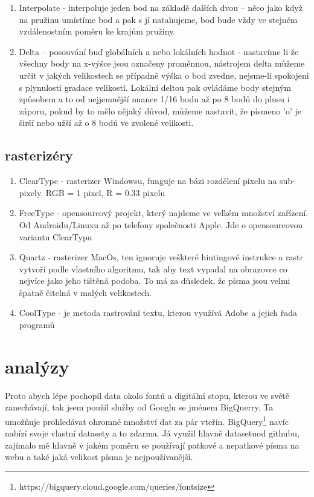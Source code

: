 \documentclass[a4paper]{article}
\begin{document}
\begin{enumerate}
\begin{enumerate}
\item Interpolate - interpoluje jeden bod na základě dalších dvou – něco jako když na pružinu umístíme bod a pak s jí natahujeme, bod bude vždy ve stejném vzdálenostním poměru ke krajům pružiny.

\item Delta – posouvání buď globálních a nebo lokálních hodnot - nastavíme li že všechny body na x-výšce jsou označeny proměnnou, nástrojem delta můžeme určit v jakých velikostech se případně výška o bod zvedne, nejsme-li spokojeni s plynulostí gradace velikostí. Lokální deltou pak ovládáme body stejným způsobem a to od nejjemnější nuance 1/16 bodu až po 8 bodů do plusu i záporu, pokud by to mělo nějaký důvod, můžeme nastavit, že písmeno 'o' je širší nebo užší až o 8 bodů ve zvolené velikosti. 

\end{enumerate}

\subsection{rasterizéry}

\begin{enumerate}
\item ClearType - rasterizer Windowsu, funguje na bázi rozdělení pixelu na sub-pixely. RGB = 1 pixel, R = 0.33 pixelu

\item FreeType - opensourcový projekt, který najdeme ve velkém množství zařízení. Od Androidu/Linuxu až po telefony společnosti Apple. Jde o opensourcovou variantu ClearTypu

\item Quartz - rasterizer MacOs, ten ignoruje veškteré hintingové instrukce a rastr vytvoří podle vlastního algoritmu, tak aby text vypadal na obrazovce co nejvíce jako jeho tištěná podoba. To má za důsledek, že písma jsou velmi špatně čitelná v malých velikostech.

\item CoolType - je metoda rastrování textu, kterou využívá Adobe a jejich řada programů
\end{enumerate}

\section{analýzy}
Proto abych lépe pochopil data okolo fontů a digitální stopu, kterou ve světě zanechávají, tak jsem použil služby od Googlu se jménem BigQuerry. Ta umožňuje prohledávat ohromné množství dat za pár vteřin. BigQuery\footnote{https://bigquery.cloud.google.com/queries/fontsize} navíc nabízí svoje vlastní datasety a to zdarma. Já využil hlavně datasetuod githubu, zajímalo mě hlavně v jakém poměru se používají patkové a nepatkové písma na webu a také jaká velikost písma je nejpoužívanější.


\end{enumerate}
\end{document}
